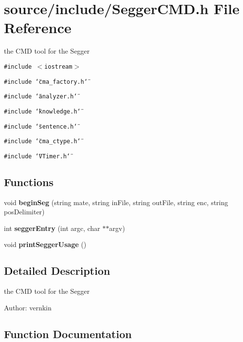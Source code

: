 \section{source/include/SeggerCMD.h File Reference}
\label{SeggerCMD_8h}
the CMD tool for the Segger 

{\tt \#include $<$iostream$>$}\par
{\tt \#include \char`\"{}cma\_\-factory.h\char`\"{}}\par
{\tt \#include \char`\"{}analyzer.h\char`\"{}}\par
{\tt \#include \char`\"{}knowledge.h\char`\"{}}\par
{\tt \#include \char`\"{}sentence.h\char`\"{}}\par
{\tt \#include \char`\"{}cma\_\-ctype.h\char`\"{}}\par
{\tt \#include \char`\"{}VTimer.h\char`\"{}}\par
\subsection*{Functions}
\begin{CompactItemize}
\item 
void {\bf beginSeg} (string mate, string inFile, string outFile, string enc, string posDelimiter)
\item 
int \textbf{seggerEntry} (int argc, char $\ast$$\ast$argv)\label{SeggerCMD_8h_e624a37c8cde5a86c57acff2b8e2b15a}

\item 
void \textbf{printSeggerUsage} ()\label{SeggerCMD_8h_7c87e8750f51eca3e1b15b7f252d5131}

\end{CompactItemize}


\subsection{Detailed Description}
the CMD tool for the Segger 

\begin{Desc}
\item[Author:]vernkin \end{Desc}


\subsection{Function Documentation}
